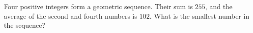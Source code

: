 Four positive integers form a geometric sequence. Their sum is $255$, and the average of the second and fourth numbers is $102$. What is the smallest number in the sequence?
